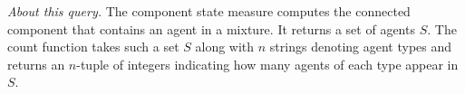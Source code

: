 \noindent \textit{About this query.} The \textsf{component} state
measure computes the connected component that contains an agent in a
mixture. It returns a set of agents $S$. The \textsf{count} function
takes such a set $S$ along with $n$ strings denoting agent types and
returns an $n$-tuple of integers indicating how many agents of each
type appear in $S$.
